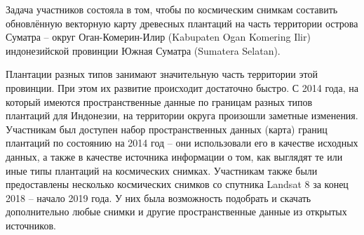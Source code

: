 Задача участников состояла в том, чтобы по космическим снимкам составить обновлённую векторную карту древесных плантаций на часть территории острова Суматра – округ Оган-Комерин-Илир (Kabupaten Ogan Komering Ilir) индонезийской провинции Южная Суматра (Sumatera Selatan).

Плантации разных типов занимают значительную часть территории этой провинции. При этом их развитие происходит достаточно быстро. С 2014 года, на который имеются пространственные данные по границам разных типов плантаций для Индонезии, на территории округа произошли заметные изменения. Участникам был доступен набор пространственных данных (карта) границ плантаций по состоянию на 2014 год – они использовали его в качестве исходных данных, а также в качестве источника информации о том, как выглядят те или иные типы плантаций на космических снимках. Участникам также были предоставлены несколько космических снимков со спутника Landsat 8 за конец 2018 – начало 2019 года. У них была возможность подобрать и скачать дополнительно любые снимки и другие пространственные данные из открытых источников.